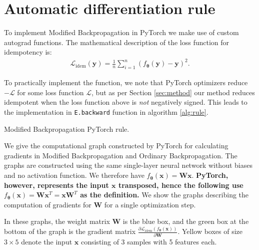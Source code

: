 \documentclass{article}
\theoremstyle{plain}
\theoremstyle{definition}
\theoremstyle{remark}
\newcommand{\vx}{\mathbf{x}}
\newcommand{\vy}{\mathbf{y}}
\newcommand{\vW}{\mathbf{W}}
\newcommand{\vtheta}{\bm{\theta}}
\newcommand{\pd}[2]{\frac{\partial{#1}}{\partial{#2}}}
\begin{document}
\newpage
\section{Automatic differentiation rule}
\label{app:autodiff-rule}
To implement Modified Backpropagation in PyTorch we make use of custom autograd functions. The mathematical description of the loss function for idempotency is:
%
\begin{align}
    \mathcal{L}_{\mathrm{idem}}(\vy) = \frac{1}{n} \sum_{i = 1}^n \left( f_{\vtheta}(\vy) - \vy \right)^2.
\end{align}

To practically implement the function, we note that PyTorch optimizers reduce $-\mathcal{L}$ for some loss function $\mathcal{L}$, but as per Section \ref{sec:method} our method reduces idempotent when the loss function above is \textit{not} negatively signed. This leads to the implementation in \texttt{E.backward} function in algorithm \ref{alg:rule}.

\begin{algorithm}[htbp]
    \caption{Modified Backpropagation PyTorch rule.}
    \label{alg:rule}
    
\end{algorithm}

\clearpage

We give the computational graph constructed by PyTorch for calculating gradients in Modified Backpropagation and Ordinary Backpropagation. The graphs are constructed using the same single-layer neural network without biases and no activation function. We therefore have ${f_{\vtheta}(\vx)=\vW\vx}$. \textbf{PyTorch, however, represents the input $\vx$ transposed, hence the following use  ${f_{\vtheta}(\vx)=\vW\vx^T=\vx\vW^T}$ as the definition.} We show the graphs describing the computation of gradients for $\vW$ for a single optimization step.

In these graphs, the weight matrix $\vW$ is the blue box, and the green box at the bottom of the graph is the gradient matrix $\pd{\mathcal{L}_{\mathrm{idem}}(f_{\vtheta}(\vx))}{\vW}$. Yellow boxes of size $3 \times 5$ denote the input $\vx$ consisting of 3 samples with 5 features each.
\end{document}
